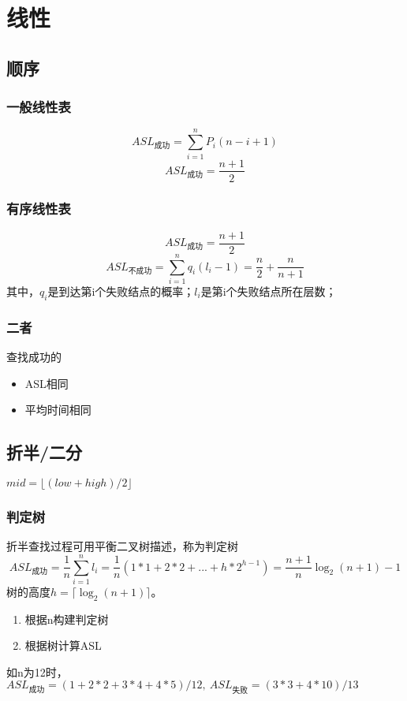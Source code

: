 \section{线性}

\subsection{顺序}

\subsubsection{一般线性表}
\[ASL_{\text{成功}} = \sum_{i = 1}^nP_i(n - i + 1)\]
\[ASL_{\text{成功}} = \dfrac{n + 1}{2}\]


\subsubsection{有序线性表}
\[ASL_{\text{成功}} = \dfrac{n + 1}{2}\]
\[ASL_{\text{不成功}} = \sum_{i = 1}^nq_i(l_i - 1) = \dfrac{n}{2} + \dfrac{n}{n + 1}\]
其中，\(q_i\)是到达第i个失败结点的概率；\(l_i\)是第i个失败结点所在层数；


\subsubsection{二者}
查找成功的
\begin{itemize}
    \item ASL相同
    \item 平均时间相同
\end{itemize}


\subsection{折半/二分}
\(mid = \lfloor(low + high) / 2\rfloor\)

\subsubsection{判定树}
折半查找过程可用平衡二叉树描述，称为判定树
\[ASL_{\text{成功}} = \dfrac{1}{n}\sum_{i = 1}^nl_i = \dfrac{1}{n}(1 * 1 + 2 * 2 + ... + h * 2^{h - 1}) = \dfrac{n + 1}{n}\log_2(n + 1) - 1\]
树的高度\(h = \lceil\log_2(n + 1)\rceil\)。
\begin{enumerate}
    \item 根据n构建判定树
    \item 根据树计算ASL
\end{enumerate}
如n为12时，\(ASL_{\text{成功}} = (1 + 2 * 2 + 3 * 4 + 4 * 5) / 12,\ ASL_{\text{失败}} = (3 * 3 + 4 * 10) / 13\)



